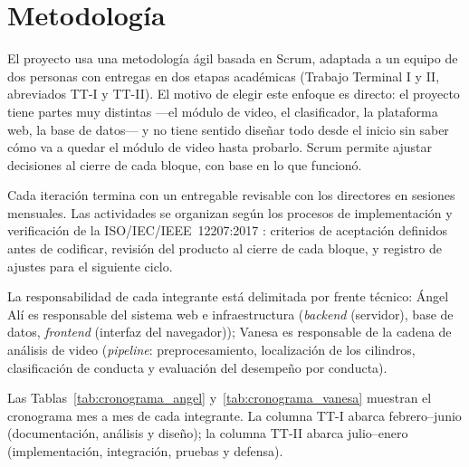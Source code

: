 \section{Metodología}

El proyecto usa una metodología ágil basada en Scrum, adaptada a un equipo de dos
personas con entregas en dos etapas académicas (Trabajo Terminal I y II, abreviados TT-I y TT-II). El motivo de elegir este
enfoque es directo: el proyecto tiene partes muy distintas ---el módulo de video, el
clasificador, la plataforma web, la base de datos--- y no tiene sentido diseñar todo
desde el inicio sin saber cómo va a quedar el módulo de video hasta probarlo.
Scrum permite ajustar decisiones al cierre de cada bloque, con base en lo que funcionó.

Cada iteración termina con un entregable revisable con los directores en sesiones
mensuales. Las actividades se organizan según los procesos de implementación y
verificación de la ISO/IEC/IEEE~12207:2017 \cite{iso12207}: criterios de aceptación
definidos antes de codificar, revisión del producto al cierre de cada bloque, y
registro de ajustes para el siguiente ciclo.

La responsabilidad de cada integrante está delimitada por frente técnico:
Ángel Alí es responsable del sistema web e infraestructura (\textit{backend} (servidor),
base de datos, \textit{frontend} (interfaz del navegador)); Vanesa es responsable de la
cadena de análisis de video (\textit{pipeline}: preprocesamiento,
localización de los cilindros, clasificación de conducta y evaluación del desempeño
por conducta).

Las Tablas~\ref{tab:cronograma_angel} y~\ref{tab:cronograma_vanesa} muestran el
cronograma mes a mes de cada integrante. La columna TT-I abarca febrero--junio
(documentación, análisis y diseño); la columna TT-II abarca julio--enero
(implementación, integración, pruebas y defensa).

